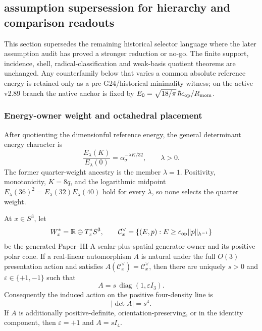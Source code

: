 \documentclass[11pt,a4paper]{article}
\begin{document}
\subsection{assumption supersession for hierarchy and comparison readouts}
\label{p6:sec:post-v125-supersession}

This section supersedes the remaining historical selector language where the
later assumption audit has proved a stronger reduction or no-go.  The finite
support, incidence, shell, radical-classification and weak-basis quotient
theorems are unchanged.  Any counterfamily below that varies a common absolute
reference energy is retained only as a pre-G24/historical minimality witness;
on the active v2.89 branch the native anchor is fixed by
\(E_0=\sqrt{18/\pi}\,\hbar c_{\rm op}/R_{\rm mom}\).

\subsubsection{Energy-owner weight and octahedral placement}
After quotienting the dimensionful reference energy, the general determinant
energy character is
\[
 \frac{E_\lambda(K)}{E_\lambda(0)}
 =\alpha_\sigma^{-\lambda K/32},\qquad \lambda>0.
\]
The former quarter-weight ancestry is the member $\lambda=1$.  Positivity,
monotonicity, $K=8q$, and the logarithmic midpoint
$E_\lambda(36)^2=E_\lambda(32)E_\lambda(40)$ hold for every $\lambda$, so none
selects the quarter weight.

\begin{theorem}
\label{p6:thm:physical-cone-fourth-power-density}
At $x\in S^3$, let
\[
 W_x^*=\mathbb R\oplus T_x^*S^3,
 \qquad
 \mathcal C_x^\vee
 =\{(E,p):E\ge c_{\rm op}\|p\|_{h^{-1}}\}
\]
be the generated Paper--III-A scalar-plus-spatial generator owner and its
positive polar cone.  If a real-linear automorphism $A$ is natural under
the full $O(3)$ presentation action and satisfies
$A(\mathcal C_x^\vee)=\mathcal C_x^\vee$, then there are uniquely
$s>0$ and $\varepsilon\in\{+1,-1\}$ such that
\begin{equation}
\label{p6:eq:natural-cone-automorphism-classification}
 A=s\,\operatorname{diag}(1,\varepsilon I_3).
\end{equation}
Consequently the induced action on the positive four-density line is
\begin{equation}
\label{p6:eq:positive-frame-density-fourth-power}
 |\det A|=s^4.
\end{equation}
If $A$ is additionally positive-definite, orientation-preserving, or in the
identity component, then $\varepsilon=+1$ and $A=sI_4$.
\end{theorem}
\end{document}
